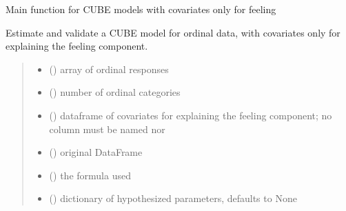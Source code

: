 \documentclass[letterpaper,10pt,english]{sphinxmanual}
\begin{document}

\begin{fulllineitems}
\label{\detokenize{cubmods:cubmods.cube_0w0.mle}}
\pysigstartsignatures
{}
\pysigstopsignatures
\sphinxAtStartPar
Main function for CUBE models with covariates only for feeling

\sphinxAtStartPar
Estimate and validate a CUBE model for ordinal data, with covariates only for explaining the
feeling component.
\begin{quote}\begin{description}
\begin{itemize}
\item {} 
\sphinxAtStartPar
{} () \textendash{} array of ordinal responses

\item {} 
\sphinxAtStartPar
{} () \textendash{} number of ordinal categories

\item {} 
\sphinxAtStartPar
{} () \textendash{} dataframe of covariates for explaining the feeling component;
no column must be named  nor 

\item {} 
\sphinxAtStartPar
{} () \textendash{} original DataFrame

\item {} 
\sphinxAtStartPar
{} () \textendash{} the formula used

\item {} 
\sphinxAtStartPar
{} (\sphinxstyleliteralemphasis{\sphinxupquote{, }}) \textendash{} dictionary of hypothesized parameters, defaults to None


\end{itemize}
\end{description}
\end{quote}
\end{fulllineitems}
\end{document}
